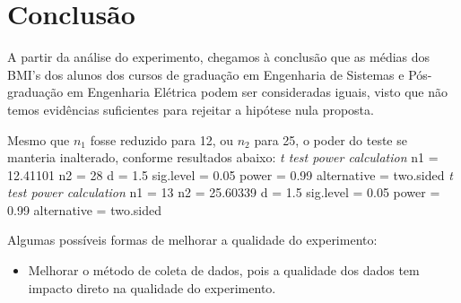 \documentclass[12pt, a4paper]{article}
\begin{document}
\section{Conclusão}
A partir da análise do experimento, chegamos à conclusão que as médias dos BMI's dos alunos dos cursos de graduação em  Engenharia de Sistemas e Pós-graduação em Engenharia Elétrica podem ser consideradas iguais, visto que não temos evidências suficientes para rejeitar a hipótese nula proposta.
\par Mesmo que $n_{1}$ fosse reduzido para 12, ou $n_{2}$ para 25, o poder do teste se manteria inalterado, conforme resultados abaixo:
\newline
\newline
\textit{t test power calculation} \newline
             n1 = 12.41101 \newline
             n2 = 28 \newline
              d = 1.5 \newline
      sig.level = 0.05 \newline
          power = 0.99 \newline
    alternative = two.sided \newline
\newline
\textit{t test power calculation} \newline
             n1 = 13 \newline
             n2 = 25.60339 \newline
              d = 1.5 \newline
      sig.level = 0.05 \newline
          power = 0.99 \newline
    alternative = two.sided \newline
\newline
\par Algumas possíveis formas de melhorar a qualidade do experimento:
\begin{itemize}
\item Melhorar o método de coleta de dados, pois a qualidade dos dados tem impacto direto na qualidade do experimento.
\end{itemize}

\begin{thebibliography}{6}
\end{thebibliography}		
		
\end{document}
